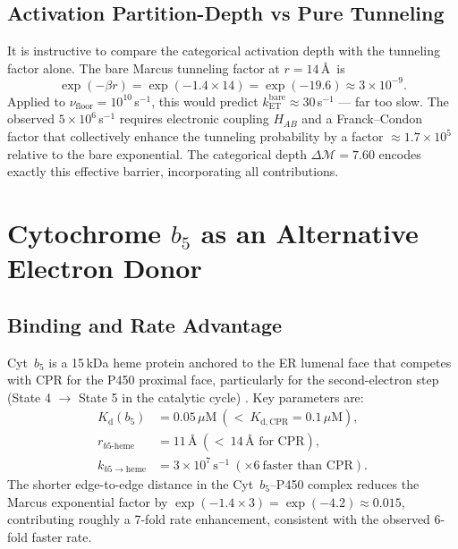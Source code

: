 \documentclass[11pt,twocolumn,a4paper]{article}
\theoremstyle{definition}
\theoremstyle{remark}
\newcommand{\depth}{\mathcal{M}}
\begin{document}
\subsection{Activation Partition-Depth vs Pure Tunneling}

It is instructive to compare the categorical activation depth with the
tunneling factor alone. The bare Marcus tunneling factor at $r = 14$\,\AA\ is
\begin{equation}
  \exp(-\beta r) = \exp(-1.4 \times 14) = \exp(-19.6) \approx 3\times10^{-9}.
\end{equation}
Applied to $\nu_\mathrm{floor} = 10^{10}$\,s$^{-1}$, this would predict
$k_\mathrm{ET}^\mathrm{bare} \approx 30$\,s$^{-1}$ — far too slow. The
observed $5\times10^6$\,s$^{-1}$ requires electronic coupling $H_{AB}$ and
a Franck--Condon factor that collectively enhance the tunneling probability by
a factor $\approx 1.7\times10^5$ relative to the bare exponential. The
categorical depth $\Delta\depth = 7.60$ encodes exactly this effective barrier,
incorporating all contributions.

\section{Cytochrome $b_5$ as an Alternative Electron Donor}

\subsection{Binding and Rate Advantage}

Cyt~$b_5$ is a 15\,kDa heme protein anchored to the ER lumenal face that
competes with CPR for the P450 proximal face, particularly for the
second-electron step (State 4 $\to$ State 5 in the catalytic cycle) \citep{henderson2013}.
Key parameters are:
\begin{align}
  K_\mathrm{d}(b_5) &= 0.05\,\mu\mathrm{M}\ (<\ K_\mathrm{d,CPR} = 0.1\,\mu\mathrm{M}),\\
  r_{b5\text{-heme}} &= 11\,\text{\AA}\ (<\ 14\,\text{\AA\ for CPR}),\\
  k_{b5\to\mathrm{heme}} &= 3\times10^7\,\text{s}^{-1}\ (\times 6\ \text{faster than CPR}).
\end{align}
The shorter edge-to-edge distance in the Cyt~$b_5$--P450 complex reduces the
Marcus exponential factor by $\exp(-1.4\times3) = \exp(-4.2) \approx 0.015$,
contributing roughly a 7-fold rate enhancement, consistent with the observed
6-fold faster rate.
\end{document}
